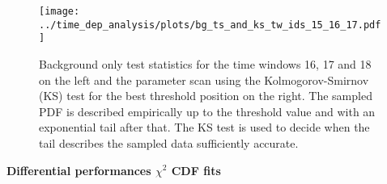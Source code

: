 \begin{figure}[H]
  \centering
  \texttt{[image: ../time\_dep\_analysis/plots/bg\_ts\_and\_ks\_tw\_ids\_15\_16\_17.pdf]}
  \caption[Background-only test statistics for the time windows 16, 17 and 18]{
    Background only test statistics for the time windows 16, 17 and 18 on the left and the parameter scan using the Kolmogorov-Smirnov (KS) test for the best threshold position on the right.
    The sampled PDF is described empirically up to the threshold value and with an exponential tail after that.
    The KS test is used to decide when the tail describes the sampled data sufficiently accurate.
  }
  \label{fig:bg_ts_and_ks_tw_ids_15_16_17}
\end{figure}

\newpage
\textbf{\Large\sffamily Differential performances $\chi^2$ CDF fits}
